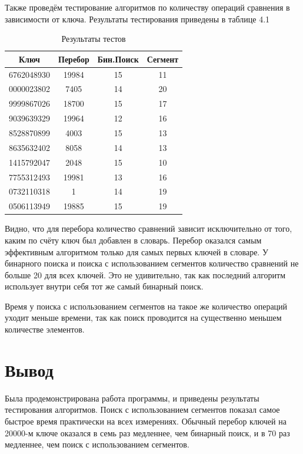 Также проведём тестирование алгоритмов по количеству операций сравнения в зависимости от ключа.
Результаты тестирования приведены в таблице 4.1

\FloatBarrier
\begin{table}[h]
	\caption{Результаты тестов}
	\centering
	\begin{tabular}{ | c | c | c | c |}
		\hline
		Ключ & Перебор & Бин.Поиск & Сегмент \\ 
		\hline
		6762048930 & 19984 & 15 & 11 \\
		0000023802 & 7405 & 14 & 20 \\
		9999867026 & 18700 & 15 & 17 \\
		9039639329 & 19964 & 12 & 16 \\
		8528870899 & 4003 & 15 & 13 \\
		8635632402 & 8058 & 14 & 13 \\
		1415792047 & 2048 & 15 & 10 \\
		7755312493 & 19981 & 13 & 16 \\
		0732110318 & 1 & 14 & 19 \\
		0506113949 & 19885 & 15 & 19 \\
		\hline
	\end{tabular}
\end{table}
\FloatBarrier

Видно, что для перебора количество сравнений зависит исключительно от того, каким по счёту ключ был добавлен в словарь.
Перебор оказался самым эффективным алгоритмом только для самых первых ключей в словаре.
У бинарного поиска и поиска с использованием сегментов количество сравнений не больше 20 для всех ключей.
Это не удивительно, так как последний алгоритм использует внутри себя тот же самый бинарный поиск.

Время у поиска с использованием сегментов на такое же количество операций уходит меньше времени, так как 
поиск проводится на существенно меньшем количестве элементов.

\section{Вывод}
Была продемонстрирована работа программы, и приведены результаты тестирования алгоритмов.
Поиск с использованием сегментов показал самое быстрое время практически на всех измерениях.
Обычный перебор ключей на 20000-м ключе оказался в семь раз медленнее, чем бинарный поиск, и в 70 раз медленнее, чем поиск с использованием сегментов.